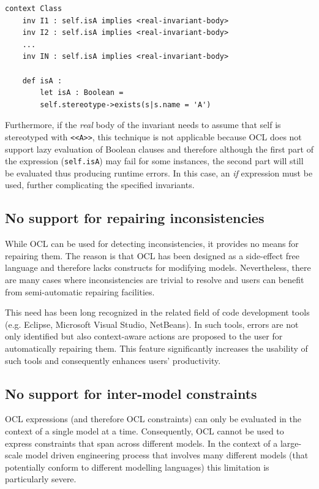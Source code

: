 \begin{lstlisting}[basicstyle=\ttfamily\footnotesize, flexiblecolumns=true, numbers=none, nolol=true, caption=Demonstration of OCL constraints with duplication, label=lst:OCLDuplication, tabsize=2, language=OCL2]
context Class
	inv I1 : self.isA implies <real-invariant-body>
	inv I2 : self.isA implies <real-invariant-body>
	...
	inv IN : self.isA implies <real-invariant-body>
	
	def isA :
		let isA : Boolean = 
		self.stereotype->exists(s|s.name = 'A')
\end{lstlisting}

Furthermore, if the \emph{real} body of the invariant needs to assume that self is stereotyped with \verb|<<A>>|, this technique is not applicable because OCL does not support lazy evaluation of Boolean clauses \cite{OCL} and therefore although the first part of the expression (\verb|self.isA|) may fail for some instances, the second part will still be evaluated thus producing runtime errors. In this case, an \textit{if} expression must be used, further complicating the specified invariants.

\subsection{No support for repairing inconsistencies} 
\label{sec:Issue5}
While OCL can be used for detecting inconsistencies, it provides no means for repairing them. The reason is that OCL has been designed as a side-effect free language and therefore lacks constructs for modifying models. Nevertheless, there are many cases where inconsistencies are trivial to resolve and users can benefit from semi-automatic repairing facilities. 

This need has been long recognized in the related field of code development tools (e.g. Eclipse, Microsoft Visual Studio, NetBeans). In such tools, errors are not only identified but also context-aware actions are proposed to the user for automatically repairing them. This feature significantly increases the usability of such tools and consequently enhances users' productivity.\\

\subsection{No support for inter-model constraints}
\label{sec:Issue6}
OCL expressions (and therefore OCL constraints) can only be evaluated in the context of a single model at a time. Consequently, OCL cannot be used to express constraints that span across different models. In the context of a large-scale model driven engineering process that involves many different models (that potentially conform to different modelling languages) this limitation is particularly severe.\\

